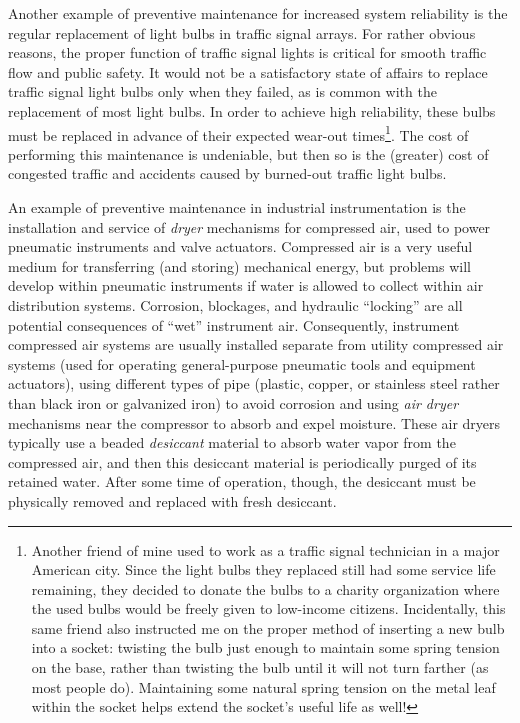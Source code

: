 Another example of preventive maintenance for increased system reliability is the regular replacement of light bulbs in traffic signal arrays.  For rather obvious reasons, the proper function of traffic signal lights is critical for smooth traffic flow and public safety.  It would not be a satisfactory state of affairs to replace traffic signal light bulbs only when they failed, as is common with the replacement of most light bulbs.  In order to achieve high reliability, these bulbs must be replaced in advance of their expected wear-out times\footnote{Another friend of mine used to work as a traffic signal technician in a major American city.  Since the light bulbs they replaced still had some service life remaining, they decided to donate the bulbs to a charity organization where the used bulbs would be freely given to low-income citizens.  Incidentally, this same friend also instructed me on the proper method of inserting a new bulb into a socket: twisting the bulb just enough to maintain some spring tension on the base, rather than twisting the bulb until it will not turn farther (as most people do).  Maintaining some natural spring tension on the metal leaf within the socket helps extend the socket's useful life as well!}.  The cost of performing this maintenance is undeniable, but then so is the (greater) cost of congested traffic and accidents caused by burned-out traffic light bulbs.

An example of preventive maintenance in industrial instrumentation is the installation and service of \textit{dryer} mechanisms for compressed air, used to power pneumatic instruments and valve actuators.  Compressed air is a very useful medium for transferring (and storing) mechanical energy, but problems will develop within pneumatic instruments if water is allowed to collect within air distribution systems.  Corrosion, blockages, and hydraulic ``locking'' are all potential consequences of ``wet'' instrument air.  Consequently, instrument compressed air systems are usually installed separate from utility compressed air systems (used for operating general-purpose pneumatic tools and equipment actuators), using different types of pipe (plastic, copper, or stainless steel rather than black iron or galvanized iron) to avoid corrosion and using \textit{air dryer} mechanisms near the compressor to absorb and expel moisture.  These air dryers typically use a beaded \textit{desiccant} material to absorb water vapor from the compressed air, and then this desiccant material is periodically purged of its retained water.  After some time of operation, though, the desiccant must be physically removed and replaced with fresh desiccant.        






